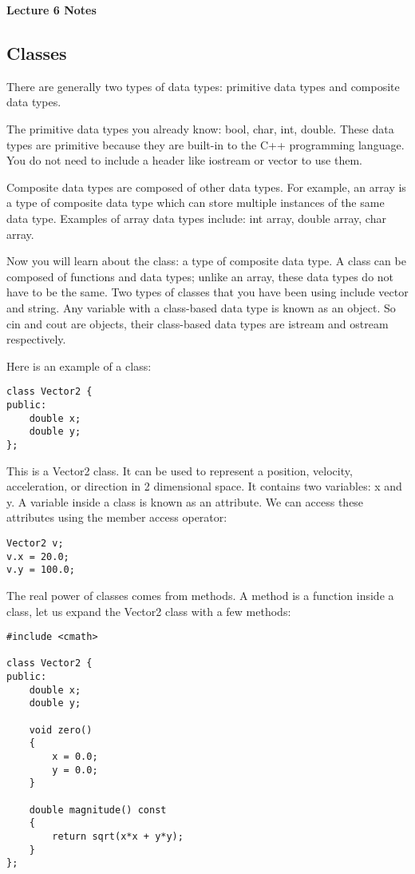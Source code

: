 \documentclass[a4paper,12pt]{article}
\begin{document}
\lstset{frame=single,tabsize=4,basicstyle=\ttfamily}

{\centering \bf \Large
Lecture 6 Notes \\[\baselineskip]
}

\subsection*{Classes}

There are generally two types of data types: primitive data types and composite data types.

The primitive data types you already know: bool, char, int, double. These data types are primitive because they are built-in to the C++ programming language. You do not need to include a header like iostream or vector to use them. 

Composite data types are composed of other data types. For example, an array is a type of composite data type which can store multiple instances of the same data type. Examples of array data types include: int array, double array, char array. 

Now you will learn about the class: a type of composite data type. A class can be composed of functions and data types; unlike an array, these data types do not have to be the same. Two types of classes that you have been using include vector and string. Any variable with a class-based data type is known as an object. So cin and cout are objects, their class-based data types are istream and ostream respectively. 

Here is an example of a class:

\begin{lstlisting}
class Vector2 {
public:
	double x;
	double y;
};
\end{lstlisting}

This is a Vector2 class. It can be used to represent a position, velocity, acceleration, or direction in 2 dimensional space. It contains two variables: x and y. A variable inside a class is known as an attribute. We can access these attributes using the member access operator:

\begin{lstlisting}
Vector2 v;
v.x = 20.0;
v.y = 100.0;
\end{lstlisting}

The real power of classes comes from methods. A method is a function inside a class, let us expand the Vector2 class with a few methods:

\begin{lstlisting}
#include <cmath>

class Vector2 {
public:
	double x;
	double y;

	void zero()
	{
		x = 0.0;
		y = 0.0;
	}

	double magnitude() const
	{
		return sqrt(x*x + y*y);
	}
};
\end{lstlisting}
\end{document}
